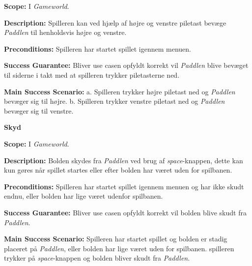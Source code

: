 \textbf{Scope:}\newline
I \textit{Gameworld}.\newline

\textbf{Description:} \newline
Spilleren kan ved hjælp af højre og venstre piletast bevæge \textit{Paddlen} til henholdsvis højre og venstre.\newline

\textbf{Preconditions:}\newline
Spilleren har startet spillet igennem menuen.\newline

\textbf{Success Guarantee:}\newline
Bliver use casen opfyldt korrekt vil \textit{Paddlen} blive bevæget til siderne i takt med at spilleren trykker piletasterne ned.\newline

\textbf{Main Success Scenario:}\newline
 a. Spilleren trykker højre piletast ned og \textit{Paddlen} bevæger sig til højre.\newline
 b. Spilleren trykker venstre piletast ned og \textit{Paddlen} bevæger sig til venstre.\newline \newline


\textbf{Skyd}\newline

\textbf{Scope:}\newline
I \textit{Gameworld}.\newline

\textbf{Description:} \newline
Bolden skydes fra \textit{Paddlen} ved brug af \textit{space}-knappen, dette kan kun gøres når spillet startes eller efter bolden har været uden for spilbanen. \newline

\textbf{Preconditions:}\newline
Spilleren har startet spillet igennem menuen og har ikke skudt endnu, eller bolden har lige været udenfor spilbanen.\newline

\textbf{Success Guarantee:}\newline
Bliver use casen opfyldt korrekt vil bolden blive skudt fra \textit{Paddlen}.\newline

\textbf{Main Success Scenario:}\newline
Spilleren har startet spillet og bolden er stadig placeret på \textit{Paddlen}, eller bolden har lige været uden for spilbanen. spilleren trykker på \textit{space}-knappen og bolden bliver skudt fra \textit{Paddlen}.\newline

